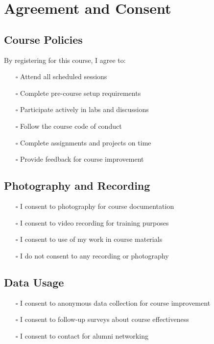 \documentclass[11pt,a4paper]{article}
\begin{document}
\section{Agreement and Consent}

\subsection{Course Policies}
By registering for this course, I agree to:
\begin{itemize}[leftmargin=0.5cm]
    \item[$\square$] Attend all scheduled sessions
    \item[$\square$] Complete pre-course setup requirements
    \item[$\square$] Participate actively in labs and discussions
    \item[$\square$] Follow the course code of conduct
    \item[$\square$] Complete assignments and projects on time
    \item[$\square$] Provide feedback for course improvement
\end{itemize}

\subsection{Photography and Recording}
\begin{itemize}[leftmargin=0.5cm]
    \item[$\square$] I consent to photography for course documentation
    \item[$\square$] I consent to video recording for training purposes
    \item[$\square$] I consent to use of my work in course materials
    \item[$\square$] I do not consent to any recording or photography
\end{itemize}

\subsection{Data Usage}
\begin{itemize}[leftmargin=0.5cm]
    \item[$\square$] I consent to anonymous data collection for course improvement
    \item[$\square$] I consent to follow-up surveys about course effectiveness
    \item[$\square$] I consent to contact for alumni networking
\end{itemize}
\end{document}
